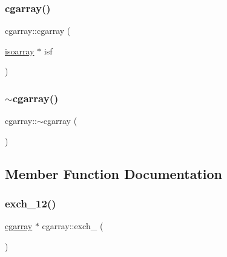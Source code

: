\mbox{\label{classcgarray_a0a9d804cf3256428f8d8937749a8b776}} 
\subsubsection{\texorpdfstring{cgarray()}{cgarray()}\hspace{0.1cm}{\footnotesize\ttfamily [2/2]}}
{\footnotesize\ttfamily cgarray\+::cgarray (\begin{DoxyParamCaption}\item[{\mbox{\hyperlink{classisoarray}{isoarray}} $\ast$}]{isf }\end{DoxyParamCaption})}

\mbox{\label{classcgarray_af332defc2438028410ad8e2ae98aa848}} 
\subsubsection{\texorpdfstring{$\sim$cgarray()}{~cgarray()}\hspace{0.1cm}{\footnotesize\ttfamily [2/2]}}
{\footnotesize\ttfamily cgarray\+::$\sim$cgarray (\begin{DoxyParamCaption}{ }\end{DoxyParamCaption})}



\subsection{Member Function Documentation}
\mbox{\label{classcgarray_a59212ed070a6ebdc199063d7c7eaee50}} 
\subsubsection{\texorpdfstring{exch\_12()}{exch\_12()}\hspace{0.1cm}{\footnotesize\ttfamily [1/2]}}
{\footnotesize\ttfamily \mbox{\hyperlink{classcgarray}{cgarray}} $\ast$ cgarray\+::exch\+\_ (\begin{DoxyParamCaption}{ }\end{DoxyParamCaption})}

